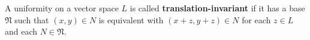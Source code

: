A uniformity on a vector space $L$ is called \textbf{translation-invariant} if it has a base $\mathfrak{N}$ such that $(x, y) \in N$ is equivalent with $(x + z, y + z) \in N$ for each $z \in L$ and each $N \in \mathfrak{N}$.
